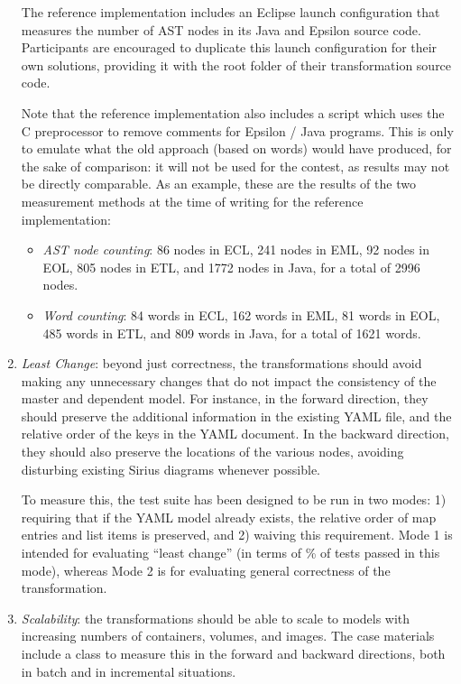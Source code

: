 \documentclass[twocolumn]{ceurart}
\begin{document}
\begin{enumerate}
  The reference implementation includes an Eclipse launch configuration that
  measures the number of AST nodes in its Java and Epsilon source code.
  Participants are encouraged to duplicate this launch configuration for their
  own solutions, providing it with the root folder of their transformation
  source code.

  Note that the reference implementation also includes a 
  script which uses the C preprocessor to remove comments for Epsilon / Java
  programs. This is only to emulate what the old approach (based on words) would
  have produced, for the sake of comparison: it will not be used for the
  contest, as results may not be directly comparable. As an example, these are
  the results of the two measurement methods at the time of writing for the
  reference implementation:

  \begin{itemize}
  \item \emph{AST node counting}: 86 nodes in ECL, 241 nodes in EML, 92 nodes in
    EOL, 805 nodes in ETL, and 1772 nodes in Java, for a total of 2996 nodes.

  \item \emph{Word counting}: 84 words in ECL, 162 words in EML, 81 words in
    EOL, 485 words in ETL, and 809 words in Java, for a total of 1621 words.
  \end{itemize}

\item \emph{Least Change}: beyond just correctness, the transformations should
  avoid making any unnecessary changes that do not impact the consistency of the
  master and dependent model. For instance, in the forward direction, they
  should preserve the additional information in the existing YAML file, and the
  relative order of the keys in the YAML document. In the backward direction,
  they should also preserve the locations of the various nodes, avoiding
  disturbing existing Sirius diagrams whenever possible.

  To measure this, the test suite has been designed to be run in two modes: 1)
  requiring that if the YAML model already exists, the relative order of map
  entries and list items is preserved, and 2) waiving this requirement. Mode 1
  is intended for evaluating ``least change'' (in terms of \% of tests passed in
  this mode), whereas Mode 2 is for evaluating general correctness of the
  transformation.

\item \emph{Scalability}: the transformations should be able to scale to models
  with increasing numbers of containers, volumes, and images. The case materials
  include a  class to measure this in the
  forward and backward directions, both in batch and in incremental situations.

\end{enumerate}
\end{document}
